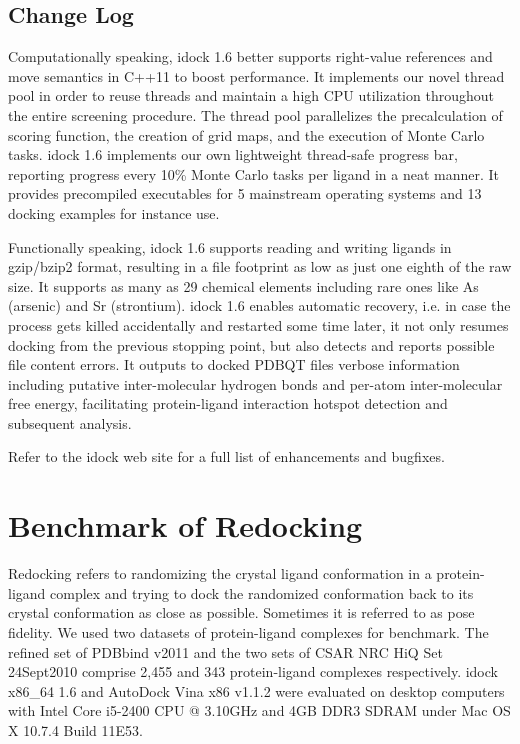 \documentclass{bioinfo}
\begin{document}
\begin{methods}
\section{Change Log}

Computationally speaking, idock 1.6 better supports right-value references and move semantics in C++11 to boost performance. It implements our novel thread pool in order to reuse threads and maintain a high CPU utilization throughout the entire screening procedure. The thread pool parallelizes the precalculation of scoring function, the creation of grid maps, and the execution of Monte Carlo tasks. idock 1.6 implements our own lightweight thread-safe progress bar, reporting progress every 10\% Monte Carlo tasks per ligand in a neat manner. It provides precompiled executables for 5 mainstream operating systems and 13 docking examples for instance use.

Functionally speaking, idock 1.6 supports reading and writing ligands in gzip/bzip2 format, resulting in a file footprint as low as just one eighth of the raw size. It supports as many as 29 chemical elements including rare ones like As (arsenic) and Sr (strontium). idock 1.6 enables automatic recovery, i.e. in case the process gets killed accidentally and restarted some time later, it not only resumes docking from the previous stopping point, but also detects and reports possible file content errors. It outputs to docked PDBQT files verbose information including putative inter-molecular hydrogen bonds and per-atom inter-molecular free energy, facilitating protein-ligand interaction hotspot detection and subsequent analysis.

Refer to the idock web site for a full list of enhancements and bugfixes.

\end{methods}

\section{Benchmark of Redocking}

Redocking refers to randomizing the crystal ligand conformation in a protein-ligand complex and trying to dock the randomized conformation back to its crystal conformation as close as possible. Sometimes it is referred to as pose fidelity. We used two datasets of protein-ligand complexes for benchmark. The refined set of PDBbind v2011 \citep{530} and the two sets of CSAR NRC HiQ Set 24Sept2010 \citep{857} comprise 2,455 and 343 protein-ligand complexes respectively. idock x86\_64 1.6 and AutoDock Vina x86 v1.1.2 were evaluated on desktop computers with Intel Core i5-2400 CPU @ 3.10GHz and 4GB DDR3 SDRAM under Mac OS X 10.7.4 Build 11E53.
\end{document}
